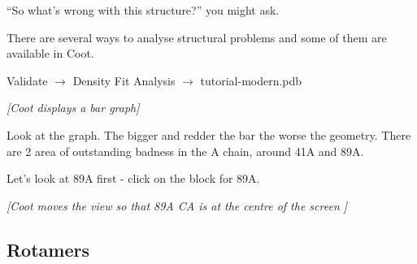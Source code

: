 \documentclass{article}
\begin{document}
``So what's wrong with this structure?'' you might ask.

There are several ways to analyse structural problems and some of them
are available in Coot.

\begin{trivlist}
\item \textsf{Validate $\rightarrow$ Density Fit Analysis $\rightarrow$ tutorial-modern.pdb}

\textsl{ [Coot displays a bar graph]}

\item Look at the graph.  The bigger and redder the bar the worse the
  geometry. There are 2 area of outstanding badness in the A chain,
  around 41A and 89A.
\item Let's look at 89A first - click on the block for 89A.
\end{trivlist}

\textsl{ [Coot moves the view so that 89A CA is at the centre of the
  screen ]}

\subsection{Rotamers}
\end{document}

